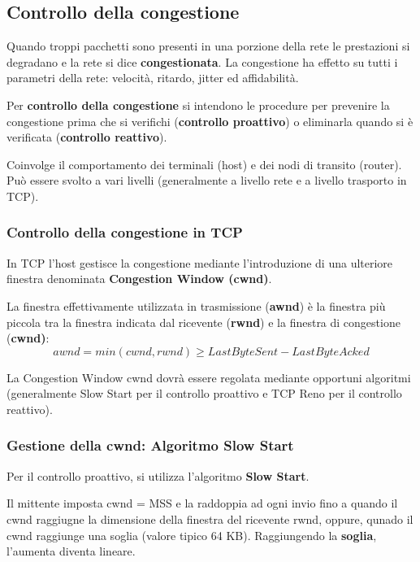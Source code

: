     \subsection{Controllo della congestione}
        Quando troppi pacchetti sono presenti in una porzione della rete le prestazioni si degradano e la rete si dice \textbf{congestionata}. La congestione ha effetto su tutti i parametri della rete: velocità, ritardo, jitter ed affidabilità.
    
        Per \textbf{controllo della congestione} si intendono le procedure per prevenire la congestione prima che si verifichi (\textbf{controllo proattivo}) o eliminarla quando si è verificata (\textbf{controllo reattivo}).
    
        Coinvolge il comportamento dei terminali (host) e dei nodi di transito (router). Può essere svolto a vari livelli (generalmente a livello rete e a livello trasporto in TCP).

        \subsubsection{Controllo della congestione in TCP}
            In TCP l'host gestisce la congestione mediante l'introduzione di una ulteriore finestra denominata \textbf{Congestion Window (cwnd)}.
        
            La finestra effettivamente utilizzata in trasmissione (\textbf{awnd}) è la finestra più piccola tra la finestra indicata dal ricevente (\textbf{rwnd}) e la finestra di congestione (\textbf{cwnd)}:
            \begin{equation*}
                awnd = min(cwnd, rwnd) \geq LastByteSent - LastByteAcked
            \end{equation*}

            La Congestion Window cwnd dovrà essere regolata mediante opportuni algoritmi (generalmente Slow Start per il controllo proattivo e TCP Reno per il controllo reattivo).

        \subsubsection{Gestione della cwnd: Algoritmo Slow Start}
            Per il controllo proattivo, si utilizza l'algoritmo \textbf{Slow Start}.
        
            Il mittente imposta cwnd = MSS e la raddoppia ad ogni invio fino a quando il cwnd raggiugne la dimensione della finestra del ricevente rwnd, oppure, qunado il cwnd raggiunge una soglia (valore tipico 64 KB). Raggiungendo la \textbf{soglia}, l'aumenta diventa lineare.

